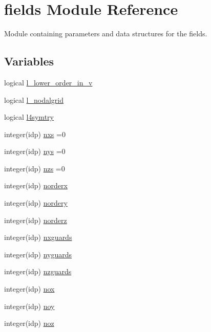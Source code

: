 \hypertarget{namespacefields}{}\section{fields Module Reference}
\label{namespacefields}


Module containing parameters and data structures for the fields.  


\subsection*{Variables}
\begin{DoxyCompactItemize}
\item 
logical \hyperlink{namespacefields_a5a24e83e3fb185459ab237b37188c1d8}{l\+\_\+lower\+\_\+order\+\_\+in\+\_\+v}
\item 
logical \hyperlink{namespacefields_ab18c95cb8d4e80527bd87db458526d68}{l\+\_\+nodalgrid}
\item 
logical \hyperlink{namespacefields_afcffe2f0f052e32d9e264c035db32bde}{l4symtry}
\item 
integer(idp) \hyperlink{namespacefields_a930a275ec3d0c2c725a19a016cf140f0}{nxs} =0
\item 
integer(idp) \hyperlink{namespacefields_adc125104f8f7666c683e307ad9703412}{nys} =0
\item 
integer(idp) \hyperlink{namespacefields_aa0a3c8b650acfd6add1cfe59383b4b0e}{nzs} =0
\item 
integer(idp) \hyperlink{namespacefields_a5db7070b5dbdeed3416e2ab8405978ef}{norderx}
\item 
integer(idp) \hyperlink{namespacefields_a9f1111bb7c59399b756f2fcb13db9285}{nordery}
\item 
integer(idp) \hyperlink{namespacefields_a1ed7522a1b4a7bc6460525f798d1619e}{norderz}
\item 
integer(idp) \hyperlink{namespacefields_a4ac76b76df65c6d646d63da6b1cd642c}{nxguards}
\item 
integer(idp) \hyperlink{namespacefields_ad86b91ec6fa696f154aebb594c867bf2}{nyguards}
\item 
integer(idp) \hyperlink{namespacefields_a08a746304a8f4b59076abee85eb82642}{nzguards}
\item 
integer(idp) \hyperlink{namespacefields_a9a721e4dba76280df41937c60a91e390}{nox}
\item 
integer(idp) \hyperlink{namespacefields_ae0f614311e278825c771b1b6fa3d0596}{noy}
\item 
integer(idp) \hyperlink{namespacefields_a30badcbccf6fb02a7301a38cb9d27eff}{noz}

\end{DoxyCompactItemize}
